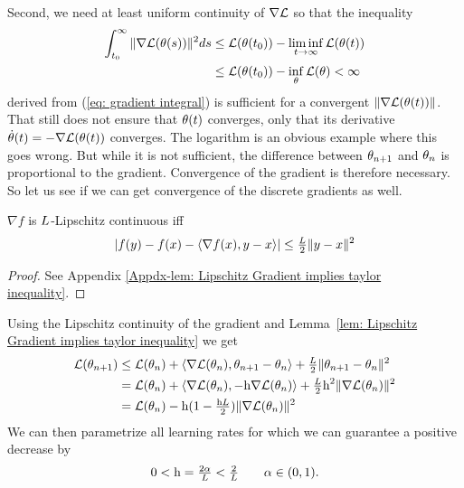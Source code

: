 Second, we need at least uniform continuity of \(\nabla \mathcal{L}\) so that the inequality
%
\begin{align}\label{eq: bounded gradient integral}
	\int_{t_0}^\infty \|\nabla \mathcal{L}(\theta(s))\|^2 ds
	&\le \mathcal{L}(\theta(t_0)) - \liminf_{t\to\infty} \mathcal{L}(\theta(t)) \\
	&\le \mathcal{L}(\theta(t_0)) - \inf_{\theta} \mathcal{L}(\theta) < \infty \nonumber
\end{align}
%
derived from (\ref{eq: gradient integral}) is sufficient for a convergent
\(\|\nabla \mathcal{L}(\theta(t))\|\). That still does not ensure that \(\theta(t)\)
converges, only that its derivative \(\dot{\theta}(t) = -\nabla \mathcal{L}(\theta(t))\)
converges. The logarithm is an obvious example where this goes wrong. But
while it is not sufficient, the difference between \(\theta_{n+1}\) and
\(\theta_n\) is proportional to the gradient. Convergence of the gradient is
therefore necessary.
So let us see if we can get convergence of the discrete gradients as well.
%
\begin{lemma}
	\label{lem: Lipschitz Gradient implies taylor inequality}
	\(\nabla f\) is \(L\)-Lipschitz continuous iff
	\begin{align*}
		| f(y) - f(x) - \langle \nabla f(x), y-x\rangle |
		\le \tfrac{L}2 \|y-x\|^2
	\end{align*}
\end{lemma}
\begin{proof}
	See Appendix \ref{Appdx-lem: Lipschitz Gradient implies taylor inequality}.
\end{proof}
%
\noindent
Using the Lipschitz continuity of the gradient and Lemma~\ref{lem: Lipschitz
Gradient implies taylor inequality} we get
%
\begin{align}
	\mathcal{L}(\theta_{n+1})
	&\le \mathcal{L}(\theta_n) 
	+ \langle\nabla \mathcal{L}(\theta_n),\theta_{n+1} - \theta_n\rangle
	+ \tfrac{L}{2} \| \theta_{n+1} - \theta_n\|^2 
	\label{eq: bound increment}\\
	&= \mathcal{L}(\theta_n)
	+ \langle\nabla \mathcal{L}(\theta_n), -\text{h}\nabla \mathcal{L}(\theta_n)\rangle
	+ \tfrac{L}{2}\text{h}^2\| \nabla \mathcal{L}(\theta_n)\|^2
	\nonumber\\
	&=\mathcal{L}(\theta_n) - \text{h}(1-\tfrac{\text{h} L}{2})\|\nabla \mathcal{L}(\theta_n)\|^2
	\nonumber
\end{align}
%
We can then parametrize all learning rates for which we can guarantee a positive
decrease by
\begin{align}\label{learning rate restrictions}
	0<\text{h}=\tfrac{2\alpha}{L}<\tfrac2{L} \qquad \alpha \in (0,1).
\end{align}
